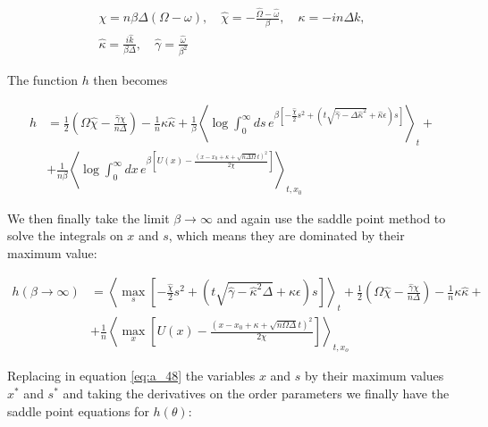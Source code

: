 \begin{align}
  \label{eq:a_anzats}
  \chi = n \beta \Delta  (\Omega - \omega), \quad \hat{\chi} = -\frac{\hat{\Omega} - \hat{\omega}}{\beta}, \quad \kappa = -in\Delta k, \\
  \hat{\kappa} = \frac{i\hat{k}}{\beta \Delta}, \quad \hat{\gamma} = \frac{\hat{\omega}}{\beta^2}
\end{align}

The function $h$ then becomes

\begin{align}
  \label{eq:a_h}
  h &= \frac{1}{2} \left(\Omega \hat{\chi} - \frac{\hat{\gamma}
      \chi}{n \Delta} \right) - \frac{1}{n} \kappa \hat{\kappa} +
  \frac{1}{\beta} \left\langle \log \int_0^\infty ds \,
  e^{\beta \left[-\frac{\hat{\chi}}{2}s^2 + (t \sqrt{\hat{\gamma} - \Delta
      \hat{\kappa}^2} + \hat{\kappa}\epsilon) s\right]}
\right\rangle_t + \nonumber \\ &+
\frac{1}{n\beta}\left\langle \log \int_0^\infty dx \, e^{\beta \left[ U(x) - \frac{(x - x_0 + \kappa +
      \sqrt{n\Delta\Omega}t)^2}{2\chi}\right]} \right\rangle_{t,x_0}
\end{align}

We then finally take the limit $\beta \to \infty$ and again use the saddle point method to solve the integrals on $x$ and $s$, which means they are dominated by their maximum value: 

\begin{align}
  \label{eq:a_48}
  h(\beta \to \infty)& = \left\langle \max_s \left[-\frac{\hat{\chi}}{2}s^2 + (t \sqrt{\hat{\gamma} - \hat{\kappa}^2 \Delta
      } + \hat{\kappa}\epsilon) s\right] \right\rangle_t +
  \frac{1}{2} \left(\Omega \hat{\chi} - \frac{\hat{\gamma}
      \chi}{n\Delta}\right) - \frac{1}{n} \kappa \hat{\kappa} + \nonumber\\ &+
  \frac{1}{n} \left\langle \max_x \left[U(x) - \frac{(x - x_0 + \kappa +
      \sqrt{n\Omega\Delta}t)^2}{2\chi}\right] \right\rangle_{t,x_o}
\end{align}

Replacing in equation \eqref{eq:a_48} the variables $x$ and $s$ by their maximum values $x^\ast$ and $s^\ast$ and taking the derivatives on the order parameters we finally have the saddle point equations for $h(\theta)$:

